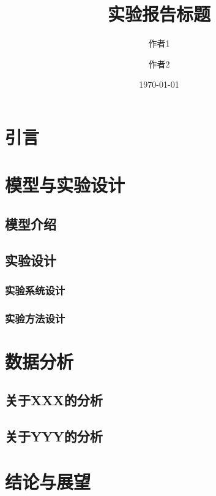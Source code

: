 \documentclass[12pt]{ctexart}   %
\title{\bfseries 实验报告标题}   %
\author{作者1 \and 作者2}        %
\date{\today}                   %
\begin{document}
\maketitle
\tableofcontents

\thispagestyle{empty}   %

\newpage      %


\section{引言}

\lipsum[2-3]


\section{模型与实验设计}

\subsection{模型介绍}

\lipsum[4-5]


\subsection{实验设计}

\subsubsection{实验系统设计}

\lipsum[3-4]

\subsubsection{实验方法设计}

\lipsum[5-6]


\section{数据分析}

\subsection{关于XXX的分析}

\lipsum[1-3]

\subsection{关于YYY的分析}

\lipsum[7-8]


\section{结论与展望}

\lipsum[9]
\end{document}
